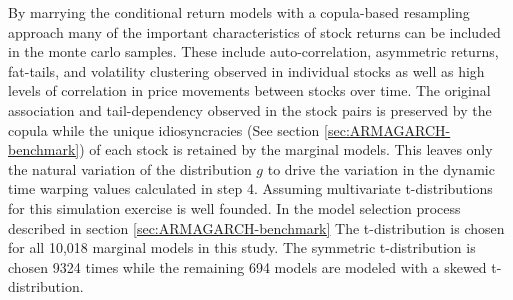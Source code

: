 \documentclass[12pt]{article}
\begin{document}
By marrying the conditional return models with a copula-based resampling approach many of the important characteristics of stock returns can be included in the monte carlo samples. These include auto-correlation, asymmetric returns, fat-tails, and volatility clustering observed in individual stocks as well as high levels of correlation in price movements between stocks over time. The original association and tail-dependency observed in the stock pairs is preserved by the copula while the unique idiosyncracies (See section \ref{sec:ARMAGARCH-benchmark}) of each stock is retained by the marginal models. This leaves only the natural variation of the distribution $g$ to drive the variation in the dynamic time warping values calculated in step 4. Assuming multivariate t-distributions for this simulation exercise is well founded. In the model selection process described in section \ref{sec:ARMAGARCH-benchmark} The t-distribution is chosen for all 10,018 marginal models in this study. The symmetric t-distribution is chosen 9324 times while the remaining 694 models are modeled with a skewed t-distribution.
\end{document}
